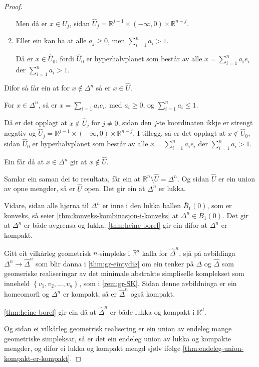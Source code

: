\documentclass[a4paper, 12pt, norsk]{article}
\theoremstyle{plain}
\theoremstyle{definition}
\newcommand{\Rb}{\mathbb{R}}
\newcommand{\set}[1]{ \left\{ #1 \right\} } %
\begin{document}
\begin{proof}
\begin{enumerate}
{				Men då er \( x \in \hat{U}_j \), sidan \( \hat{U}_j = \Rb^{j-1}\times(-\infty, 0) \times \Rb^{n-j} \). }
  		\item { Eller ein kan ha at alle \( a_j \geq 0 \), men \( \sum_{i=1}^n a_i > 1 \). 
		
				 Då er \( x \in \hat{U}_0 \), fordi \( \hat{U}_0 \) er hyperhalvplanet som består av alle \( x = \sum_{i = 1}^n a_i e_i \) der \( \sum_{i = 1}^n a_i > 1 \). }
	\end{enumerate}

	Difor så får ein at for \( x \not\in \Delta^n \) så er \( x \in \hat{U} \).

	For \( x \in \Delta^n \), så er \( x = \sum_{i=1} a_i e_i \), med \( a_i \geq 0 \), og \( \sum_{i=1}^n a_i \leq 1 \).

	Då er det opplagt at \( x \not\in \hat{U}_j \) for \( j \neq 0 \), sidan den \( j \)-te koordinaten ikkje er strengt negativ og \( \hat{U}_j = \Rb^{j-1}\times(-\infty, 0) \times \Rb^{n-j} \). I tillegg, så er det opplagt at \( x \not\in \hat{U}_0 \), sidan \( \hat{U}_0 \) er hyperhalvplanet som består av alle \( x = \sum_{i = 1}^n a_i e_i \) der \( \sum_{i = 1}^n a_i > 1 \).

	Ein får då at \( x \in \Delta^n \) gir at \( x \not\in \hat{U} \).

	Samlar ein saman dei to resultata, får ein at \( \Rb^n \setminus \hat{U} = \Delta^n \). Og sidan \( \hat{U} \) er ein union av opne mengder, så er \( \hat{U} \) open. Det gir ein at \( \Delta^n \) er lukka.

	Vidare, sidan alle hjørna til \( \Delta^n \) er inne i den lukka ballen \( \bar{B}_{1}(0) \), som er konveks, så seier \autoref{thm:konveks-kombinasjon-i-konveks} at \( \Delta^n \in \bar{B}_{1}(0) \). Det gir at \( \Delta^n \) er både avgrensa og lukka. \autoref{thm:heine-borel} gir ein difor at \( \Delta^n \) er kompakt.

	Gitt eit vilkårleg geometrisk \( n \)-simpleks i \( \Rb^d \) kalla for \( \hat{\Delta}^n \), sjå på avbildinga \( \Delta^n \to \hat{\Delta}^n \) som blir danna i \autoref{thm:gr-eintydig} om ein tenker på \( \Delta \) og \( \hat{\Delta} \) som geomeriske realiseringar av det minimale abstrakte simpliselle komplekset som inneheld \( \set{v_1, v_2, \dots, v_n} \), som i \autoref{rem:gr-SK}. Sidan denne avbildninga er ein homeomorfi og \( \Delta^n \) er kompakt, så er \( \hat{\Delta}^n \) også kompakt.

	\autoref{thm:heine-borel} gir ein då at \( \hat{\Delta}^n \) er både lukka og kompakt i \( \Rb^d \).

	Og sidan ei vilkårleg geometrisk realisering er ein union av endeleg mange geometriske simpleksar, så er det ein endeleg union av lukka og kompakte mengder, og difor ei lukka og kompakt mengd sjølv ifølge \autoref{thm:endeleg-union-kompakt-er-kompakt}.
\end{proof}
\end{document}
